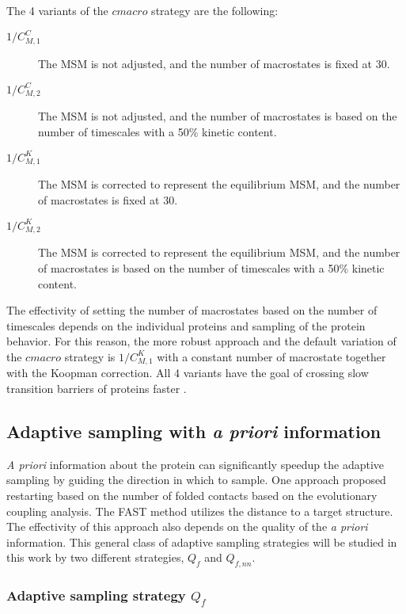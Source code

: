 The 4 variants of the $cmacro$ strategy are the following:
\begin{description}
\item[$1/C_{M,1}^C$]
The MSM is not adjusted, and the number of macrostates is fixed at 30.
\item[$1/C_{M,2}^C$]
The MSM is not adjusted, and the number of macrostates is based on the number of timescales with a 50\% kinetic content.
\item[$1/C_{M,1}^K$]
The MSM is corrected to represent the equilibrium MSM, and the number of macrostates is fixed at 30.
\item[$1/C_{M,2}^K$]
The MSM is corrected to represent the equilibrium MSM, and the number of macrostates is based on the number of timescales with a 50\% kinetic content.
\end{description}

The effectivity of setting the number of macrostates based on the number of timescales depends on the individual proteins and sampling of the protein behavior. For this reason, the more robust approach and the default variation of the $cmacro$ strategy is $1/C_{M,1}^K$ with a constant number of macrostate together with the Koopman correction. All 4 variants have the goal of crossing slow transition barriers of proteins faster \cite{Adstrategies2018}.

\subsection{Adaptive sampling with \emph{a priori} information}

\emph{A priori} information about the protein can significantly speedup the adaptive sampling by guiding the direction in which to sample. One approach \cite{EvolutionCoupling-Shamsi2017} proposed restarting based on the number of folded contacts based on the evolutionary coupling analysis. The FAST method \cite{FAST-Bowman-2015} utilizes the distance to a target structure. The effectivity of this approach also depends on the quality of the \emph{a priori} information. This general class of adaptive sampling strategies will be studied in this work by two different strategies, $Q_{f}$  and $Q_{f,nn}$.  

\subsubsection{Adaptive sampling strategy $Q_{f}$}

